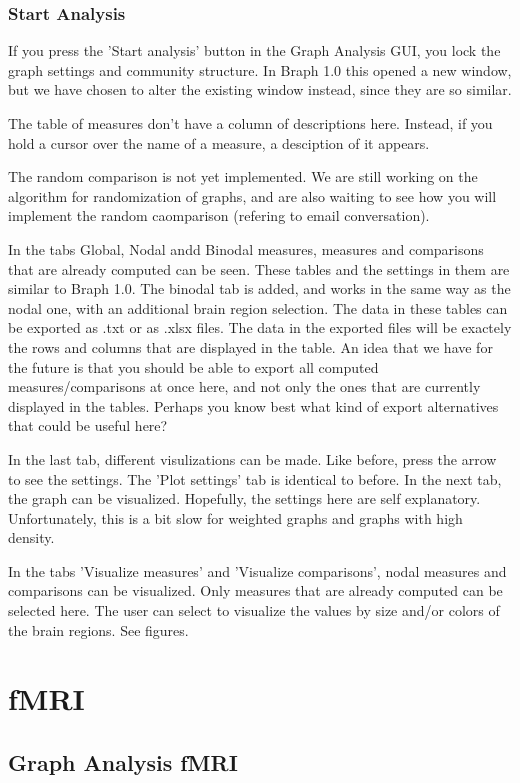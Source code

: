 \documentclass{article}
\begin{document}
\subsubsection{Start Analysis}

If you press the 'Start analysis' button in the Graph Analysis GUI, you lock the graph settings and community structure. In Braph 1.0 this opened a new window, but we have chosen to alter the existing window instead, since they are so similar. 

The table of measures don't have a column of descriptions here. Instead, if you hold a cursor over the name of a measure, a desciption of it appears. 

The random comparison is not yet implemented. We are still working on the algorithm for randomization of graphs, and are also waiting to see how you will implement the random caomparison (refering to email conversation).

In the tabs Global, Nodal andd Binodal measures, measures and comparisons that are already computed can be seen. These tables and the settings in them are similar to Braph 1.0. The binodal tab is added, and works in the same way as the nodal one, with an additional brain region selection. The data in these tables can be exported as .txt or as .xlsx files. The data in the exported files will be exactely the rows and columns that are displayed in the table. An idea that we have for the future is that you should be able to export all computed measures/comparisons at once here, and not only the ones that are currently displayed in the tables. Perhaps you know best what kind of export alternatives that could be useful here?

In the last tab, different visulizations can be made. Like before, press the arrow to see the settings. The 'Plot settings' tab is identical to before. In the next tab, the graph can be visualized. Hopefully, the settings here are self explanatory. Unfortunately, this is a bit slow for weighted graphs and graphs with high density.

In the tabs 'Visualize measures' and 'Visualize comparisons', nodal measures and comparisons can be visualized. Only measures that are already computed can be selected here. The user can select to visualize the values by size and/or colors of the brain regions. See figures.




\section{fMRI}

\subsection{Graph Analysis fMRI}
\end{document}
